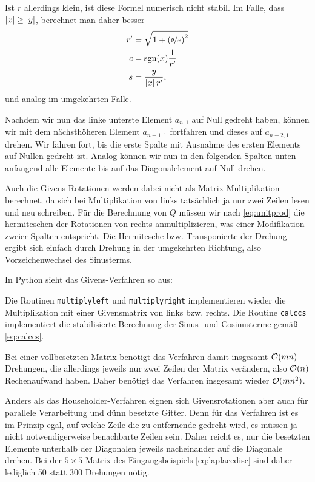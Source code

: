 Ist $r$ allerdings klein, ist diese Formel numerisch nicht stabil. Im
Falle, dass $\left\lvert{x}\right\rvert\ge\left\lvert{y}\right\rvert$, berechnet man daher besser
\begin{align}
  \label{eq:calccs}
  r'&=\sqrt{1 + \left(\nicefrac{y}{x}\right)^2}\nonumber\\
  c &=\text{sgn}(x)\frac{1}{r'}\\
  s &= \frac{y}{\left\lvert{x}\right\rvert r'}\nonumber,
\end{align}
und analog im
umgekehrten Falle.

Nachdem wir nun das linke unterste Element $a_{n,1}$ auf Null gedreht
haben, können wir mit dem nächsthöheren Element $a_{n-1,1}$ fortfahren
und dieses auf $a_{n-2,1}$ drehen. Wir fahren fort, bis die erste
Spalte mit Ausnahme des ersten Elements auf Nullen gedreht ist. Analog
können wir nun in den folgenden Spalten unten anfangend alle Elemente
bis auf das Diagonalelement auf Null drehen.

Auch die Givens-Rotationen werden dabei nicht als
Matrix-Multiplikation berechnet, da sich bei Multiplikation von links
tatsächlich ja nur zwei Zeilen lesen und neu schreiben. Für die
Berechnung von $Q$ müssen wir nach \eqref{eq:unitprod} die hermiteschen der
Rotationen von rechts anmultiplizieren, was einer Modifikation zweier
Spalten entspricht. Die Hermitesche bzw. Transponierte der Drehung
ergibt sich einfach durch Drehung in der umgekehrten Richtung, also
Vorzeichenwechsel des Sinusterms.

\clearpage

In Python sieht das Givens-Verfahren so aus:

Die Routinen \lstinline!multiplyleft! und \lstinline!multiplyright!
implementieren wieder die Multiplikation mit einer Givensmatrix von
links bzw. rechts. Die Routine \lstinline!calccs! implementiert die
stabilisierte Berechnung der Sinus- und Cosinusterme gemäß \eqref{eq:calccs}.

Bei einer vollbesetzten Matrix benötigt das Verfahren damit insgesamt
$\mathcal O(mn)$ Drehungen, die allerdings jeweils nur zwei Zeilen der Matrix
verändern, also $\mathcal O(n)$ Rechenaufwand haben. Daher benötigt das
Verfahren insgesamt wieder $\mathcal O(mn^2)$.

Anders als das Householder-Verfahren eignen sich Givensrotationen aber
auch für parallele Verarbeitung und dünn besetzte Gitter. Denn für das
Verfahren ist es im Prinzip egal, auf welche Zeile die zu entfernende
gedreht wird, es müssen ja nicht notwendigerweise benachbarte Zeilen
sein. Daher reicht es, nur die besetzten Elemente unterhalb der
Diagonalen jeweils nacheinander auf die Diagonale drehen. Bei der
$5\times 5$-Matrix des Eingangsbeispiels \eqref{eq:laplacedisc} sind
daher lediglich 50 statt 300 Drehungen nötig.

